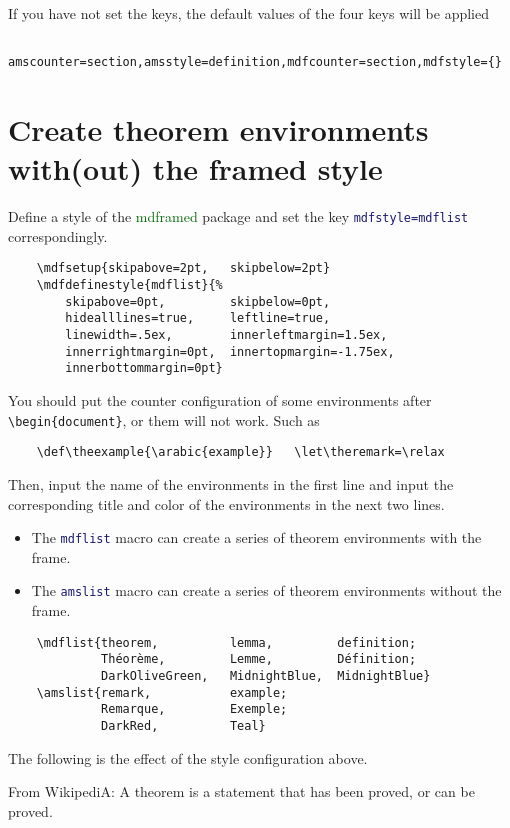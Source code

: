 \documentclass[11pt,svgnames]{article}
\def\pkg#1{\textcolor{DarkGreen}{\textsf{#1}}}
\def\cmd#1{\textcolor{MidnightBlue}{\texttt{\string#1}}}
\begin{document}
If you have not set the keys, the default values of the four keys will be applied
\begin{verbatim}
    amscounter=section,amsstyle=definition,mdfcounter=section,mdfstyle={}
\end{verbatim}

\section{Create theorem environments with(out) the framed style}

Define a style of the \pkg{mdframed} package and set the key \cmd{mdfstyle=mdflist} correspondingly.
\begin{verbatim}
    \mdfsetup{skipabove=2pt,   skipbelow=2pt}
    \mdfdefinestyle{mdflist}{%
        skipabove=0pt,         skipbelow=0pt,
        hidealllines=true,     leftline=true,
        linewidth=.5ex,        innerleftmargin=1.5ex,
        innerrightmargin=0pt,  innertopmargin=-1.75ex,
        innerbottommargin=0pt}
\end{verbatim}

You should put the counter configuration of some environments after \verb|\begin{document}|, or them will not work. Such as
\begin{verbatim}
    \def\theexample{\arabic{example}}   \let\theremark=\relax
\end{verbatim}

Then, input the name of the environments in the first line and input the corresponding title and color of the environments in the next two lines.
\begin{itemize}
    \item The \cmd{mdflist} macro can create a series of theorem environments with the frame.
    \item The \cmd{amslist} macro can create a series of theorem environments without the frame.
\end{itemize}
\begin{verbatim}
    \mdflist{theorem,          lemma,         definition;
             Théorème,         Lemme,         Définition;
             DarkOliveGreen,   MidnightBlue,  MidnightBlue}
    \amslist{remark,           example;
             Remarque,         Exemple;
             DarkRed,          Teal}
\end{verbatim}

The following is the effect of the style configuration above.

\begin{theorem}\leavevmode\newline
    From WikipediA: A theorem is a statement that has been proved, or can be proved.
\end{theorem}
\end{document}
